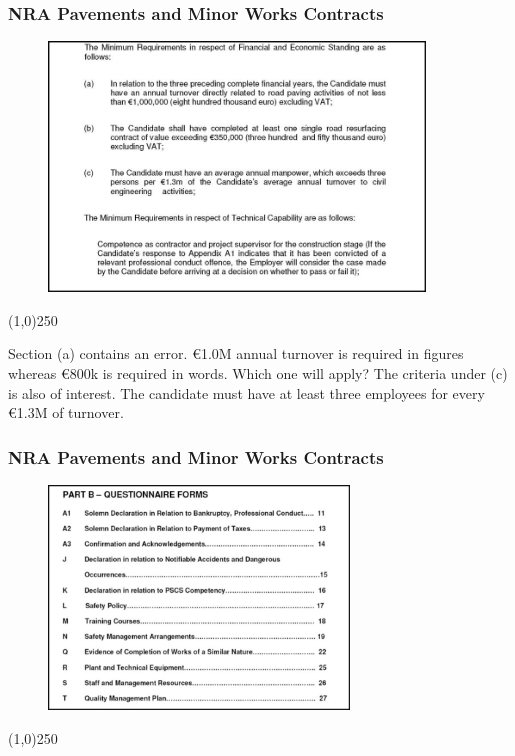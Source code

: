 \begin{frame}
\frametitle{NRA Pavements and Minor Works Contracts}
\begin{figure}
	\centering
		\includegraphics[width = 10cm]{images/prequal2.jpg}
	\label{fig:prequal2}
\end{figure}
\end{frame}\begin{center}\line(1,0){250}\end{center}
Section (a) contains an error.  \euro1.0M annual turnover is required in figures whereas \euro800k is required in words.  Which one will apply?  The criteria under (c) is also of interest.  The candidate must have at least three employees for every \euro1.3M of turnover.   


\begin{frame}
\frametitle{NRA Pavements and Minor Works Contracts}
\begin{figure}
	\centering
		\includegraphics[width = 8cm]{images/prequal3.jpg}
	\label{fig:prequal3}
\end{figure}
\end{frame}\begin{center}\line(1,0){250}\end{center}


